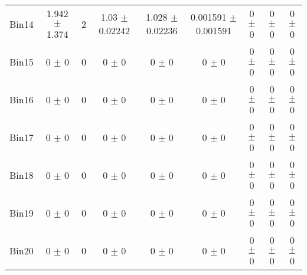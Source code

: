 \begin{tabular}{@{\extracolsep{4pt}}lcccccccc@{}}
     Bin14 & 1.942 $\pm$ 1.374 & 2 & 1.03 $\pm$ 0.02242 & 1.028 $\pm$ 0.02236 & 0.001591 $\pm$ 0.001591 & 0 $\pm$ 0 & 0 $\pm$ 0 & 0 $\pm$ 0 \\ 
     Bin15 & 0 $\pm$ 0 & 0 & 0 $\pm$ 0 & 0 $\pm$ 0 & 0 $\pm$ 0 & 0 $\pm$ 0 & 0 $\pm$ 0 & 0 $\pm$ 0 \\ 
     Bin16 & 0 $\pm$ 0 & 0 & 0 $\pm$ 0 & 0 $\pm$ 0 & 0 $\pm$ 0 & 0 $\pm$ 0 & 0 $\pm$ 0 & 0 $\pm$ 0 \\ 
     Bin17 & 0 $\pm$ 0 & 0 & 0 $\pm$ 0 & 0 $\pm$ 0 & 0 $\pm$ 0 & 0 $\pm$ 0 & 0 $\pm$ 0 & 0 $\pm$ 0 \\ 
     Bin18 & 0 $\pm$ 0 & 0 & 0 $\pm$ 0 & 0 $\pm$ 0 & 0 $\pm$ 0 & 0 $\pm$ 0 & 0 $\pm$ 0 & 0 $\pm$ 0 \\ 
     Bin19 & 0 $\pm$ 0 & 0 & 0 $\pm$ 0 & 0 $\pm$ 0 & 0 $\pm$ 0 & 0 $\pm$ 0 & 0 $\pm$ 0 & 0 $\pm$ 0 \\ 
     Bin20 & 0 $\pm$ 0 & 0 & 0 $\pm$ 0 & 0 $\pm$ 0 & 0 $\pm$ 0 & 0 $\pm$ 0 & 0 $\pm$ 0 & 0 $\pm$ 0 \\ 
\hline\hline
  \end{tabular}
